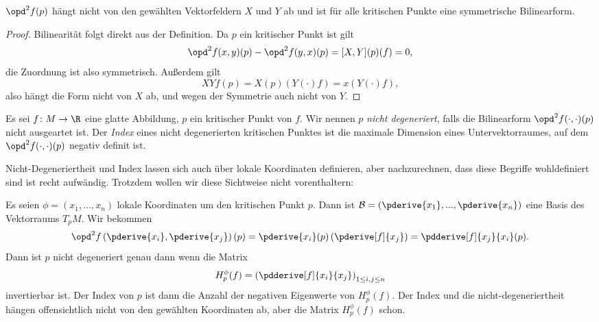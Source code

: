 \begin{prop}
    $\opd^2 f (p)$ hängt nicht von den gewählten Vektorfeldern $X$ und $Y$ ab und ist
    für alle kritischen Punkte eine symmetrische Bilinearform.
\end{prop}

\begin{proof}
    Bilinearität folgt direkt aus der Definition.
    Da $p$ ein kritischer Punkt ist gilt 
    \[ \opd^2 f (x, y) (p) - \opd^2 f (y, x) (p) = [X, Y] (p) (f) = 0, \]
    die Zuordnung ist also symmetrisch. Außerdem gilt
    \[ XY f (p) = X(p) (Y(\cdot) f) = x(Y(\cdot) f), \]
    also hängt die Form nicht von $X$ ab, und wegen der Symmetrie auch nicht von $Y$.
\end{proof}

\begin{definition}
    Es sei $f \colon M \to \R$ eine glatte Abbildung, $p$ ein kritischer Punkt von
    $f$. Wir nennen $p$ \textit{nicht degeneriert}, falls die Bilinearform 
    $\opd^2 f (\cdot, \cdot) (p)$ nicht ausgeartet ist. Der \textit{Index} eines
    nicht degenerierten kritischen Punktes ist die maximale Dimension eines
    Untervektorraumes, auf dem $\opd^2 f (\cdot, \cdot) (p)$ negativ definit ist.
\end{definition}

\begin{remark}
    Nicht-Degeneriertheit und Index lassen sich auch über lokale Koordinaten definieren,
    aber nachzurechnen, dass diese Begriffe wohldefiniert sind ist recht aufwändig.
    Trotzdem wollen wir diese Sichtweise nicht vorenthaltern:

    Es seien $\phi = (x_1, ..., x_n)$ lokale Koordinaten um den kritischen Punkt $p$. 
    Dann ist $\mathcal{B} = \left(\pderive{x_1}, ..., \pderive{x_n}\right)$ eine Basis des
    Vektorraums $T_pM$. Wir bekommen
    \[ 
        \opd^2 f \left( \pderive{x_i}, \pderive{x_j} \right) (p) 
        = \pderive{x_i}(p) \left( \pderive[f]{x_j} \right) 
        = \pdderive[f]{x_j}{x_i} (p).
    \]
    Dann ist $p$ nicht degeneriert genau dann wenn die Matrix
    \[ H^\phi_p(f) = \left( \pdderive[f]{x_i}{x_j} \right)_{1 \leq i, j \leq n} \]
    invertierbar ist. Der Index von $p$ ist dann die Anzahl der negativen Eigenwerte
    von $H^\phi_p(f)$. Der Index und die nicht-degeneriertheit hängen offensichtlich
    nicht von den gewählten Koordinaten ab, aber die Matrix $H_p^{\phi}(f)$ schon.
\end{remark}

